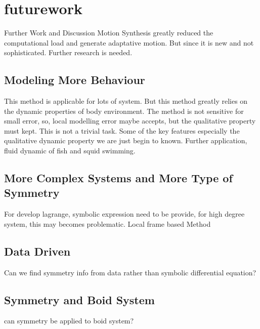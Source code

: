 \section{futurework}
Further Work and Discussion
Motion Synthesis greatly reduced the computational load and generate adaptative motion.
But since it is new and not sophisticated.
Further research is needed.
\subsection{ Modeling More Behaviour}
This method is applicable for lots of system.
But this method greatly relies on the dynamic properties of body environment.
The method is not sensitive for small error, so, local modelling error maybe accepts, but the qualitative property must kept.
This is not a trivial task.
 Some of the key features especially the qualitative dynamic property we are just begin to known.
Further application, fluid dynamic of fish and squid swimming.
\subsection{ More Complex Systems and More Type of Symmetry}
For develop lagrange, symbolic expression need to be provide, for high degree system, this may becomes problematic.
Local frame based Method
\subsection{Data Driven}
Can we find symmetry info from data rather than symbolic differential equation?
\subsection{Symmetry and Boid System}
can symmetry be applied to boid system?